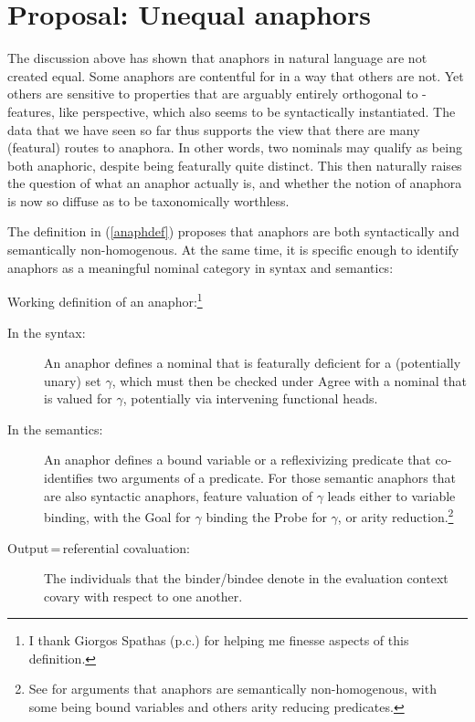\documentclass[output=paper, modfonts, nonflat]{langsci/langscibook}
\begin{document}
\section{Proposal: Unequal anaphors}
\label{secclass}

The discussion above has shown that anaphors in natural language are
not created equal. Some anaphors are contentful for \person{} in a way
that others are not. Yet others are sensitive to properties that are
arguably entirely orthogonal to \ph-features, like perspective, which
also seems to be syntactically instantiated. The data that we have
seen so far thus supports the view that there are many (featural)
routes to anaphora. In other words, two nominals may qualify as being
both anaphoric, despite being featurally quite distinct. This then
naturally raises the question of what an anaphor actually is, and
whether the notion of anaphora is now so diffuse as to be
taxonomically worthless.

The definition in (\ref{anaphdef}) proposes that anaphors are both
syntactically and semantically non-homogenous. At the same time, it is
specific enough to identify anaphors as a meaningful nominal category
in syntax and semantics: 

  \begin{exe}
    \ex\label{anaphdef} Working definition of an
      anaphor:\footnote{I thank Giorgos Spathas (p.c.) for helping me
        finesse aspects of this definition.}
\begin{description}
\item[In the syntax:] An anaphor defines a nominal that is featurally
  deficient for a (potentially unary) set $\gamma$, which must then be
  checked under Agree with a nominal that is valued for $\gamma$,
  potentially via intervening functional heads.
\item[In the semantics:] An anaphor defines a bound variable or a
  reflexivizing predicate that co-identifies two arguments of a
  predicate. For those semantic anaphors that are also syntactic
  anaphors, feature valuation of $\gamma$ leads either to variable
  binding, with the Goal for $\gamma$ binding the Probe for $\gamma$,
  or arity reduction.\footnote{See \citet{spathas:2010, spathas:2015}
    for arguments that anaphors are semantically non-homogenous, with
    some being bound variables and others arity reducing predicates.}
\item[Output\,=\,referential covaluation:] The individuals that the
  binder\slash bindee denote in the evaluation context covary with respect
  to one another. 
  \end{description}
\end{exe}
\end{document}
